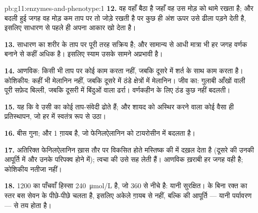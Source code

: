 \begin{solution}{pb:g11:enzymes-and-phenotype:1}
\textbf{12.} वह  वहाँ बैठा है जहाँ वह उस मोड़ को थामे रखता है;
और बदली हुई जगह वह मोड़ कम ताप पर तो जोड़े रखती है पर कुछ ही अंश ऊपर उसे
ढीला पड़ने देती है, इसलिए  साधारण  से पहले ही अपना आकार खो
देता है।

\textbf{13.} साधारण  का  शरीर के ताप पर पूरी तरह सक्रिय है;
और सामान्य से आधी मात्रा भी हर जगह वर्णक बनाने से कहीं अधिक है। इसलिए
स्याम  उसके सामने अप्रभावी है।

\textbf{14.} आणविक: किसी भी ताप पर कोई काम करता  नहीं, जबकि दूसरे
में शर्त के साथ काम करता  है। कोशिकीय: कहीं भी मेलानिन नहीं, जबकि
दूसरे में ठंडे क्षेत्रों में मेलानिन। जीव का: गुलाबी आँखों वाली पूरी सफ़ेद
बिल्ली, जबकि दूसरी में बिंदुओं वाला ढर्रा। वर्णकहीन के लिए ठंड कुछ नहीं
बदलती।

\textbf{15.} यह कि वे उसी  का कोई ताप-संवेदी  ढोते हैं; और शायद
 को अस्थिर करने वाला कोई वैसा ही प्रतिस्थापन, जो हर  में
स्वतंत्र रूप से उठा।

\textbf{16.} बीस गुना; और  1 ग़ायब है, जो फेनिलऐलानिन को टायरोसीन
में बदलता है।

\textbf{17.} अतिरिक्त फेनिलऐलानिन ख़ास तौर पर विकसित होते मस्तिष्क की
 में दख़ल देता है (दूसरे  की उनकी आपूर्ति में और उनके
परिपक्व होने में); त्वचा की  उसे सह लेती हैं। आणविक ख़राबी हर जगह
वही है; कोशिकीय नतीजा नहीं।

\textbf{18.} \num{1200} का पाँचवाँ हिस्सा \qty{240}{\micro mol/L} है, जो
\num{360} से नीचे है: यानी सुरक्षित।  के बिना रक्त का स्तर बस सेवन
के पीछे-पीछे चलता है, इसलिए  अकेले ग़ायब  से नहीं, बल्कि
 की आपूर्ति --- यानी पर्यावरण --- से तय होता है।


\end{solution}
